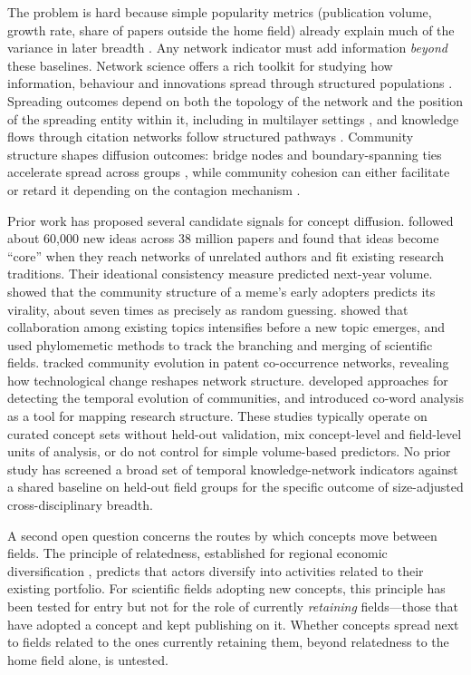 \documentclass[11pt,letterpaper]{article}
\begin{document}
The problem is hard because simple popularity metrics (publication volume, growth rate, share of papers outside the home field) already explain much of the variance in later breadth \citep{Rotolo2015}. Any network indicator must add information \emph{beyond} these baselines. Network science offers a rich toolkit for studying how information, behaviour and innovations spread through structured populations \citep{Milli2018}. Spreading outcomes depend on both the topology of the network and the position of the spreading entity within it, including in multilayer settings \citep{Domenico2016}, and knowledge flows through citation networks follow structured pathways \citep{Renoust2017}. Community structure shapes diffusion outcomes: bridge nodes and boundary-spanning ties accelerate spread across groups \citep{Cherifi2019,Burt2004}, while community cohesion can either facilitate or retard it depending on the contagion mechanism \citep{Centola2010,Ugander2012}.

Prior work has proposed several candidate signals for concept diffusion. \citet{Cheng2023} followed about 60{,}000 new ideas across 38 million papers and found that ideas become ``core'' when they reach networks of unrelated authors and fit existing research traditions. Their ideational consistency measure predicted next-year volume. \citet{Weng2013} showed that the community structure of a meme's early adopters predicts its virality, about seven times as precisely as random guessing. \citet{Salatino2017} showed that collaboration among existing topics intensifies before a new topic emerges, and \citet{Chavalarias2013} used phylomemetic methods to track the branching and merging of scientific fields. \citet{Gao2018} tracked community evolution in patent co-occurrence networks, revealing how technological change reshapes network structure. \citet{Sattar2023} developed approaches for detecting the temporal evolution of communities, and \citet{Callon1991} introduced co-word analysis as a tool for mapping research structure. These studies typically operate on curated concept sets without held-out validation, mix concept-level and field-level units of analysis, or do not control for simple volume-based predictors. No prior study has screened a broad set of temporal knowledge-network indicators against a shared baseline on held-out field groups for the specific outcome of size-adjusted cross-disciplinary breadth.

A second open question concerns the routes by which concepts move between fields. The principle of relatedness, established for regional economic diversification \citep{Hidalgo2007,Boschma2015}, predicts that actors diversify into activities related to their existing portfolio. For scientific fields adopting new concepts, this principle has been tested for entry but not for the role of currently \emph{retaining} fields---those that have adopted a concept and kept publishing on it. Whether concepts spread next to fields related to the ones currently retaining them, beyond relatedness to the home field alone, is untested.
\end{document}
